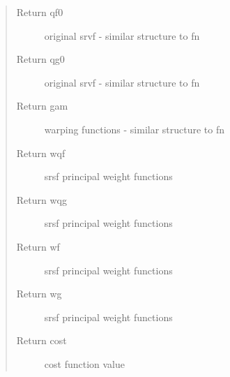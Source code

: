 \documentclass[letterpaper,10pt,english]{sphinxmanual}
\begin{document}
\begin{fulllineitems}
\begin{quote}
\begin{description}
\item[{Return qf0}] \leavevmode
original srvf - similar structure to fn

\item[{Return qg0}] \leavevmode
original srvf - similar structure to fn

\item[{Return gam}] \leavevmode
warping functions - similar structure to fn

\item[{Return wqf}] \leavevmode
srsf principal weight functions

\item[{Return wqg}] \leavevmode
srsf principal weight functions

\item[{Return wf}] \leavevmode
srsf principal weight functions

\item[{Return wg}] \leavevmode
srsf principal weight functions

\item[{Return cost}] \leavevmode
cost function value

\end{description}\end{quote}

\end{fulllineitems}

\end{document}
